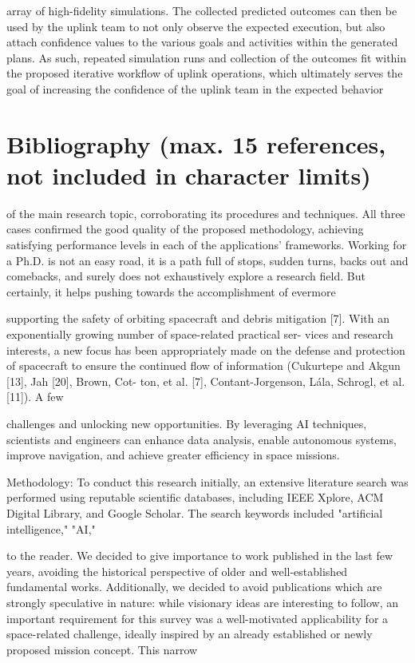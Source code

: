 \documentclass[a4paper,12pt]{article}
\begin{document}
array of high-ﬁdelity simulations. The collected predicted
outcomes can then be used by the uplink team to not only
observe the expected execution, but also attach conﬁdence
values to the various goals and activities within the generated
plans. As such, repeated simulation runs and collection of the
outcomes ﬁt within the proposed iterative workﬂow of uplink
operations, which ultimately serves the goal of increasing
the conﬁdence of the uplink team in the expected behavior

\section{Bibliography (max. 15 references, not included in character limits)}

of the main research topic, corroborating its procedures and techniques. All
three cases confirmed the good quality of the proposed methodology, achieving
satisfying performance levels in each of the applications’ frameworks.
Working for a Ph.D. is not an easy road, it is a path full of stops, sudden turns,
backs out and comebacks, and surely does not exhaustively explore a research
field. But certainly, it helps pushing towards the accomplishment of evermore

supporting the safety of orbiting spacecraft and debris mitigation [7].
With an exponentially growing number of space-related practical ser-
vices and research interests, a new focus has been appropriately made
on the defense and protection of spacecraft to ensure the continued
ﬂow of information (Cukurtepe and Akgun [13], Jah [20], Brown, Cot-
ton, et al. [7], Contant-Jorgenson, Lála, Schrogl, et al. [11]). A few

challenges and unlocking new opportunities. By 
leveraging AI techniques, scientists and engineers 
can enhance data analysis, enable autonomous 
systems, improve navigation, and achieve greater 
efficiency in space missions. 
 
Methodology: 
To conduct this research initially, an extensive 
literature search was performed using reputable 
scientific databases, including IEEE Xplore, ACM 
Digital Library, and Google Scholar. The search 
keywords included "artificial intelligence," "AI,"

to the reader. We decided to give importance to work published in the last few years,
avoiding the historical perspective of older and well-established fundamental works.
Additionally, we decided to avoid publications which are strongly speculative in
nature: while visionary ideas are interesting to follow, an important requirement for
this survey was a well-motivated applicability for a space-related challenge, ideally
inspired by an already established or newly proposed mission concept. This narrow
\end{document}
